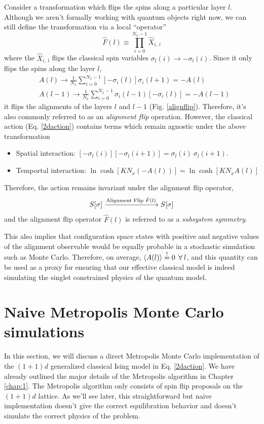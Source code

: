 \documentclass[../thesis_main.tex]{subfiles}
\begin{document}
Consider a transformation which flips the spins along a particular layer $l$. Although we aren't formally working with quantum objects right now, we can still define the transformation via a local ``operator'' 
\begin{equation}
    \hat{F}(l) \equiv \prod_{i=0}^{N_x-1} \hat{X}_{i, \: l}
    \label{alignmentflip}
\end{equation}
where the $\hat{X}_{i, \: l}$ flips the classical spin variables $\sigma_{l}(i) \longrightarrow -\sigma_{l}(i)$. Since it only flips the spins along the layer $l$, 
\begingroup
\allowdisplaybreaks
\begin{align}
    &A(l) \longrightarrow \frac{1}{N_x} \sum_{i=0}^{N_x-1} [-\sigma_i (l)] \sigma_i(l+1) = -A(l) \nonumber \\
    &A(l-1) \longrightarrow \frac{1}{N_x} \sum_{i=0}^{N_x-1} \sigma_i (l-1) [-\sigma_i(l)] = -A(l-1)
\end{align}
\endgroup
it flips the alignments of the layers $l$ and $l-1$ (Fig. \ref{alignflip}). Therefore, it's also commonly referred to as an \textit{alignment flip} operation. However, the classical action (Eq. \eqref{2daction}) contains terms which remain agnostic under the above transformation 
\begin{itemize}
    \setlength{\itemsep}{0.1em}
    \item Spatial interaction: $\displaystyle [-\sigma_l(i)] [-\sigma_l(i+1)] = \sigma_l(i) \: \sigma_{l}(i+1)$.
    \item Temportal interaction: $\displaystyle \ln \cosh[K N_x (-A(l))] = \ln \cosh [K N_x A(l)]$ 
\end{itemize}
Therefore, the action remains invariant under the alignment flip operator,
\begin{equation}
    S[\sigma] \xlongrightarrow{\text{Alignment Flip } \hat{F}(l)} S[\sigma]
    \label{actioninvariant}
\end{equation}
and the alignment flip operator $\hat{F}(l)$ is referred to as a \textit{subsystem symmetry}. 

This also implies that configuration space states with positive and negative values of the alignment observable would be equally probable in a stochastic simulation such as Monte Carlo. Therefore, on average, $\expval{A(l)} \stackrel{!}{=} 0 \:\: \forall \: l$, and this quantity can be used as a proxy for ensuring that our effective classical model is indeed simulating the singlet constrained physics of the quantum model.

\section{Naive Metropolis Monte Carlo simulations}
In this section, we will discuss a direct Metropolis Monte Carlo implementation of the $(1+1)d$ generalized classical Ising model in Eq. \eqref{2daction}. We have already outlined the major details of the Metropolis algorithm in Chapter \ref{chap:1}. The Metropolis algorithm only consists of spin flip proposals on the $(1+1)d$ lattice. As we'll see later, this straightforward but naive implementation doesn't give the correct equilibration behavior and doesn't simulate the correct physics of the problem.
\end{document}
